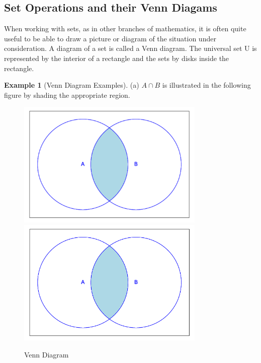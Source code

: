 \documentclass[10pt,]{book}
\theoremstyle{plain}
\theoremstyle{definition}
\newtheorem{example}[theorem]{Example}
\begin{document}
\subsection[Set Operations and their Venn Diagams ]{Set Operations and their Venn Diagams }\label{subsection-4}
When working with sets, as in other branches of mathematics, it is often quite useful to be able to draw a picture or diagram of the situation under consideration. A diagram of a set is called a Venn diagram. The universal set U is represented by the interior of a rectangle and the sets by disks inside the rectangle.%
\begin{example}[Venn Diagram Examples]\label{venn_diagram_examples}
(a) \(A \cap  B\) is illustrated in the following figure by shading the appropriate region. 
           \leavevmode%
\begin{figure}
\centering
{}%
{\includegraphics[width=0.80\textwidth]{images/sageplot-venn-intersection.pdf}}%
{\includegraphics[width=0.80\textwidth]{images/sageplot-venn-intersection.png}}
\caption{Venn Diagram\label{venn_diagram_intersection}}
\end{figure}


\end{example}
\end{document}
